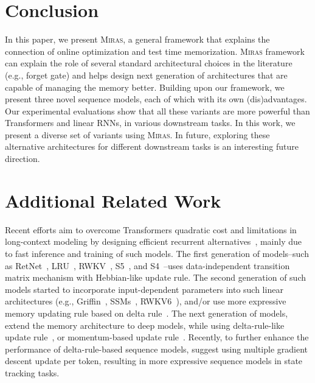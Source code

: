 \documentclass{article}
\newcommand{\citep}{\parencite}
\newcommand{\citet}{\textcite}
\newcommand{\framework}[0]{\textsc{Miras}}
\theoremstyle{plain}
\theoremstyle{definition}
\theoremstyle{remark}
\newcommand{\head}[1]{\vspace{1.7mm}\noindent{{\textcolor{c2}{\bf #1.}}}}
\begin{document}
\section{Conclusion}\label{sec:conclusion}
In this paper, we present \framework, a general framework that explains the connection of online optimization and test time memorization. \framework{} framework can explain the role of several standard architectural choices in the literature (e.g., forget gate) and helps design next generation of architectures that are capable of managing the memory better. Building upon our framework, we present three novel sequence models, each of which with its own (dis)advantages. Our experimental evaluations show that all these variants are more powerful than Transformers and linear RNNs, in various downstream tasks. In this work, we present a diverse set of variants using \framework. In future, exploring these alternative architectures for different downstream tasks is an interesting future direction.     

\newpage
\printbibliography

\newpage
\appendix

\section{Additional Related Work}

\head{Modern Linear RNNs} 
Recent efforts aim to overcome Transformers quadratic cost and limitations in long-context modeling by designing efficient recurrent alternatives~\citep{tiezzi2024resurgence}, mainly due to fast inference and training of such models. The first generation of models–such as RetNet~\citep{sun2023retentive}, LRU~\citep{orvieto2023resurrecting}, RWKV~\citep{peng2023rwkv}, S5~\citep{smith2023simplified}, and S4~\citep{gu2022efficiently}–uses data-independent transition matrix mechanism with Hebbian-like update rule. The second generation of such models started to incorporate input-dependent parameters into such linear architectures (e.g., Griffin~\citep{de2024griffin}, SSMs~\citep{hasani2023liquid, behrouz2024mambamixer, dao2024transformers}, RWKV6~\citep{peng2024eagle}), and/or use more expressive memory updating rule based on delta rule~\citep{peng2025rwkv7, schlag2021linear, yang2024parallelizing, yang2024gated, liu2024longhorn}. The next generation of models, extend the memory architecture to deep models, while using delta-rule-like update rule~\citep{sun2024learning}, or momentum-based update rule~\citep{behrouz2024titans}. Recently, to further enhance the performance of delta-rule-based sequence models, \citet{siems2025deltaproduct} suggest using multiple gradient descent update per token, resulting in more expressive sequence models in state tracking tasks. 
\end{document}
